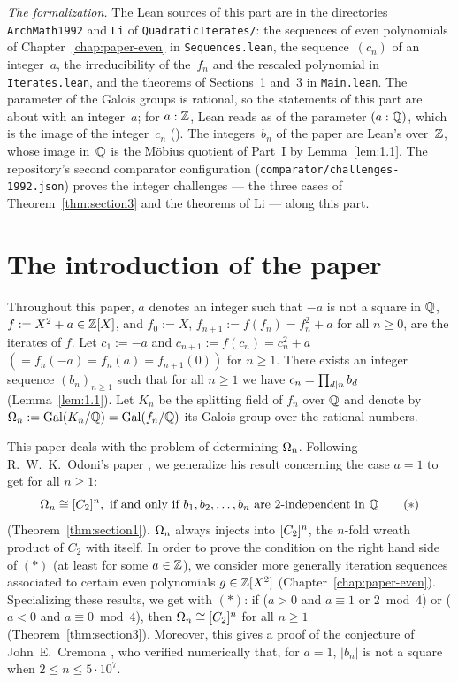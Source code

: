 \emph{The formalization.} The Lean sources of this part are in the directories
\texttt{ArchMath1992} and \texttt{Li} of \texttt{QuadraticIterates/}: the sequences of even
polynomials of Chapter~\ref{chap:paper-even} in \texttt{Sequences.lean}, the sequence~$(c_n)$ of
an integer~$a$, the irreducibility of the~$f_n$ and the rescaled polynomial in
\texttt{Iterates.lean}, and the theorems of Sections~1 and~3 in \texttt{Main.lean}. The
parameter of the Galois groups is rational, so the statements of this part are about
 with an integer~$a$; for $a : \mathbb{Z}$, Lean reads
 as  of the parameter $(a : \mathbb{Q})$, which is the image of the
integer~$c_n$ (). The integers~$b_n$ of the paper are Lean's 
over~$\mathbb{Z}$, whose image in~$\mathbb{Q}$ is the Möbius quotient of Part~I by Lemma~\ref{lem:1.1}. The
repository's second comparator configuration (\texttt{comparator/challenges-1992.json}) proves
the integer challenges --- the three cases of Theorem~\ref{thm:section3} and the theorems of
Li --- along this part.

\section*{The introduction of the paper}

Throughout this paper, $a$ denotes an integer such that $-a$ is not a square in $\mathbb{Q}$,
$f := X^2 + a \in \mathbb{Z}[X]$, and $f_0 := X$, $f_{n+1} := f(f_n) = f_n^2 + a$ for all $n \ge 0$, are
the iterates of $f$. Let $c_1 := -a$ and $c_{n+1} := f(c_n) = c_n^2 + a$
$(= f_n(-a) = f_n(a) = f_{n+1}(0))$ for $n \ge 1$. There exists an integer sequence $(b_n)_{n
\ge 1}$ such that for all $n \ge 1$ we have $c_n = \prod_{d \mathrel{\mid} n} b_d$
(Lemma~\ref{lem:1.1}). Let $K_n$ be the splitting field of $f_n$ over $\mathbb{Q}$ and denote by
$\Omega_n := \operatorname{Gal}(K_n/\mathbb{Q}) = \operatorname{Gal}(f_n/\mathbb{Q})$ its Galois group over the rational numbers.

This paper deals with the problem of determining $\Omega_n$. Following R.~W.~K.~Odoni's paper
\cite{odoni}, we generalize his result concerning the case $a = 1$ to get for all $n \ge 1$:
\[ \Omega_n \cong [C_2]^{n}, \text{ if and only if } b_1, b_2, \dots, b_n
   \text{ are $2$-independent in } \mathbb{Q} \tag{$*$} \]
(Theorem~\ref{thm:section1}). $\Omega_n$ always injects into $[C_2]^{n}$, the $n$-fold wreath product
of $C_2$ with itself. In order to prove the condition on the right hand side of $(*)$ (at least
for some $a \in \mathbb{Z}$), we consider more generally iteration sequences associated to certain even
polynomials $g \in \mathbb{Z}[X^2]$ (Chapter~\ref{chap:paper-even}). Specializing these results, we get
with $(*)$: if ($a > 0$ and $a \equiv 1$ or $2 \bmod 4$) or ($a < 0$ and $a \equiv 0 \bmod 4$),
then $\Omega_n \cong [C_2]^{n}$ for all $n \ge 1$ (Theorem~\ref{thm:section3}). Moreover, this gives a
proof of the conjecture of John~E.~Cremona \cite{cremona}, who verified numerically that, for
$a = 1$, $|b_n|$ is not a square when $2 \le n \le 5 \cdot 10^7$.
